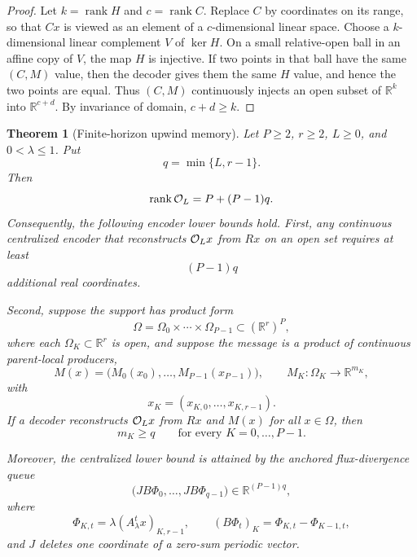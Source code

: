 \documentclass[pdflatex,sn-mathphys-num]{sn-jnl}%
\newtheorem{theorem}{Theorem}
\newcommand{\R}{\mathbb R}
\DeclareMathOperator{\rank}{rank}
\theoremstyle{thmstyleone}%
\theoremstyle{thmstyletwo}%
\theoremstyle{thmstylethree}%
\begin{document}
\begin{proof}
Let \(k=\rank H\) and \(c=\rank C\).  Replace \(C\) by coordinates on its
range, so that \(Cx\) is viewed as an element of a \(c\)-dimensional linear
space.  Choose a \(k\)-dimensional linear complement \(V\) of \(\ker H\).  On
a small relative-open ball in an affine copy of \(V\), the map \(H\) is
injective.  If two points in that ball have the same \((C,M)\) value, then
the decoder gives them the same \(H\) value, and hence the two points are
equal.  Thus \((C,M)\) continuously injects an open subset of \(\mathbb R^k\) into \(\mathbb R^{c+d}\).  By invariance of domain, \(c+d\ge k\).
\end{proof}

\begin{theorem}[Finite-horizon upwind memory]
\label{thm:rank}
Let \(P\ge2\), \(r\ge2\), \(L\ge0\), and \(0<\lambda\le1\).  Put
\[
  q=\min\{L,r-1\}.
\]
Then
\[
  \rank {\cal O}_L
  =
  P+(P-1)q.
\]
Consequently, the following encoder lower bounds hold.  First, any
continuous centralized encoder that reconstructs \({\cal O}_Lx\) from \(Rx\)
on an open set requires at least
\[
  (P-1)q
\]
additional real coordinates.

Second, suppose the support has product form
\[
  \Omega=\Omega_0\times\cdots\times\Omega_{P-1}
  \subset (\mathbb R^r)^P,
\]
where each \(\Omega_K\subset\mathbb R^r\) is open, and suppose the message is
a product of continuous parent-local producers,
\[
  M(x)=\bigl(M_0(x_0),\ldots,M_{P-1}(x_{P-1})\bigr),
  \qquad
  M_K:\Omega_K\to\mathbb R^{m_K},
\]
with
\[
  x_K=(x_{K,0},\ldots,x_{K,r-1}).
\]
If a decoder reconstructs \({\cal O}_Lx\) from \(Rx\) and \(M(x)\) for all
\(x\in\Omega\), then
\[
  m_K\ge q
  \qquad
  \text{for every }K=0,\ldots,P-1.
\]

Moreover, the centralized lower bound is attained by the anchored flux-divergence queue
\[
  \bigl(JB\Phi_0,\ldots,JB\Phi_{q-1}\bigr)
  \in\R^{(P-1)q},
\]
where
\[
  \Phi_{K,t}=\lambda(A_\lambda^t x)_{K,r-1},
  \qquad
  (B\Phi_t)_K=\Phi_{K,t}-\Phi_{K-1,t},
\]
and \(J\) deletes one coordinate of a zero-sum periodic vector.
\end{theorem}
\end{document}
